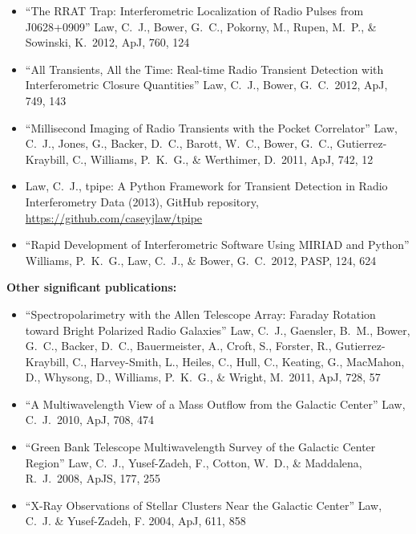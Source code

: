 \documentclass[11pt]{article}
\begin{document}
\begin{itemize}
 \item ``The RRAT Trap: Interferometric Localization of Radio Pulses from J0628+0909'' Law, C.~J., Bower, G.~C., Pokorny, M., Rupen, M.~P., \& Sowinski, K.\ 2012, ApJ, 760, 124

 \item ``All Transients, All the Time: Real-time Radio Transient Detection with Interferometric Closure Quantities'' Law, C.~J., Bower, G.~C.\ 2012, ApJ, 749, 143

 \item ``Millisecond Imaging of Radio Transients with the Pocket Correlator'' Law, C.~J., Jones, G., Backer, D.~C., Barott, W.~C., Bower, G.~C., Gutierrez-Kraybill, C., Williams, P.~K.~G., \& Werthimer, D.\ 2011, ApJ, 742, 12

 \item Law, C.~J., tpipe: A Python Framework for Transient Detection in Radio Interferometry Data (2013), GitHub repository, \url{https://github.com/caseyjlaw/tpipe}

 \item ``Rapid Development of Interferometric Software Using MIRIAD and Python'' Williams, P.~K.~G., Law, C.~J., \& Bower, G.~C.\ 2012, PASP, 124, 624 

\end{itemize}

{\bf Other significant publications:}

\begin{itemize}
 \item ``Spectropolarimetry with the Allen Telescope Array:  Faraday Rotation toward Bright Polarized Radio Galaxies'' Law, C.~J., Gaensler, B.~M., Bower, G.~C., Backer, D.~C., Bauermeister, A., Croft, S., Forster, R., Gutierrez-Kraybill, C., Harvey-Smith, L., Heiles, C., Hull, C., Keating, G., MacMahon, D., Whysong, D., Williams, P.~K.~G., \& Wright, M.\ 2011, ApJ, 728, 57

 \item ``A Multiwavelength View of a Mass Outflow from the Galactic Center'' Law, C.~J.\ 2010, ApJ, 708, 474

 \item ``Green Bank Telescope Multiwavelength Survey of the Galactic Center Region'' Law, C.~J., Yusef-Zadeh, F., Cotton, W.~D., \& Maddalena, R.~J.\ 2008, ApJS, 177, 255

 \item ``X-Ray Observations of Stellar Clusters Near the Galactic Center'' Law, C.~J. \& Yusef-Zadeh, F. 2004, ApJ, 611, 858
\end{itemize}
\end{document}
